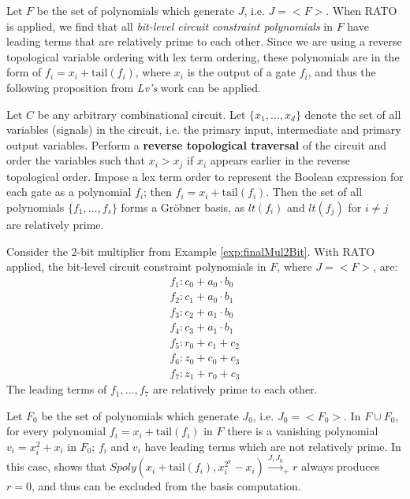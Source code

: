 Let $F$ be the set of polynomials which generate $J$, i.e. $J=<F>$. 
When RATO is applied, 
we find that all 
{\it bit-level circuit constraint
polynomials} in $F$ have leading terms that are relatively prime to each 
other. Since we are using a
reverse topological variable ordering with lex term ordering, these 
polynomials are in the 
form of $f_i = x_i + \text{tail}(f_i)$, where $x_i$ is the output of a gate $f_i$, 
and thus the following
proposition from {\it Lv's} work \cite{lv:phd} can be applied.

\begin{Proposition} \label{prop:top-order}
Let $C$ be any arbitrary combinational circuit. Let $\{x_1, \dots,
x_d\}$ denote the set of all variables (signals) in the circuit,
i.e. the primary input, intermediate and primary output
variables. Perform a {\bf reverse topological traversal} of the
circuit and order the variables such that $x_i > x_j$ if $x_i$ appears
earlier in the reverse topological order. Impose a lex term order to
represent the Boolean expression for each gate as a polynomial $f_i$;
then $f_i = x_i + \text{tail}(f_i)$. Then the set of all polynomials
$\{f_1, \dots, f_s\}$ forms a Gr\"obner basis, as $lt(f_i)$ and $
lt(f_j)$ for $i\neq j$ are relatively prime. 
\end{Proposition}

\begin{Example}
Consider the $2$-bit multiplier from Example 
\ref{exp:finalMul2Bit}. With RATO applied, the bit-level circuit constraint
polynomials in $F$, where $J=<F>$, are:
\begin{eqnarray}
		f_1:c_0+a_0 \cdot b_0 \nonumber \\
		f_2:c_1+a_0 \cdot b_1 \nonumber \\
		f_3:c_2+a_1 \cdot b_0 \nonumber \\
		f_4:c_3+a_1 \cdot b_1 \nonumber \\
		f_5:r_0+c_1 + c_2		\nonumber \\
		f_6:z_0+c_0 + c_3	\nonumber	\\
		f_7:z_1+r_0 + c_3	\nonumber	
\end{eqnarray}
The leading terms of $f_1,\dots,f_7$ are relatively prime to each other.
\label{exp:2bitmulrato}
\end{Example}

Let $F_0$ be the set of polynomials which generate $J_0$, i.e. $J_0=<F_0>$.
In $F\cup F_0$, for every polynomial $f_i = x_i + \text{tail}(f_i)$ 
in $F$ there is a vanishing polynomial $v_i = x_i^2+x_i$ in $F_0$; 
$f_i$ and $v_i$ have leading terms which are not relatively prime.
In this case, 
\cite{lv:phd} shows that $Spoly(x_i+\text{tail}(f_i), x_i^{2^k}-x_i)
\stackrel{J,J_0}{\longrightarrow}_+ r$ always produces $r=0$, and thus can
be excluded from the \Grobner basis computation.

